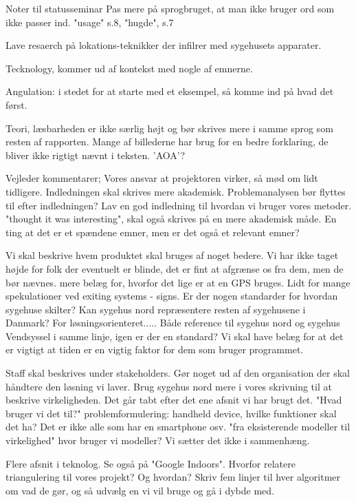 Noter til statusseminar 
Pas mere på sprogbruget, at man ikke bruger ord som ikke passer ind. "usage" s.8, "hugde", s.7

Lave resaerch på lokations-teknikker der infilrer med sygehusets apparater.

Tecknology, kommer ud af kontekst med nogle af emnerne. 

Angulation: i stedet for at starte med et eksempel, så komme ind på hvad det først.

Teori, læsbarheden er ikke særlig højt og bør skrives mere i samme sprog som resten af rapporten. 
		Mange af billederne har brug for en bedre forklaring, de bliver ikke rigtigt nævnt i teksten. 'AOA'?



Vejleder kommentarer;
Vores ansvar at projektoren virker, så mød om lidt tidligere. 
Indledningen skal skrives mere akademisk. 
Problemanalysen bør flyttes til efter indledningen?
Lav en god indledning til hvordan vi bruger vores metoder. "thought it was interesting", skal også skrives på en mere akademisk måde. En ting at det er et spændene emner, men er det også et relevant emner? 

Vi skal beskrive hvem produktet skal bruges af noget bedere. Vi har ikke taget højde for folk der eventuelt er blinde, det er fint at afgrænse os fra dem, men de bør nævnes. 
mere belæg for, hvorfor det lige er at en GPS bruges. 
Lidt for mange spekulationer ved exiting systems - signs. 
Er der nogen standarder for hvordan sygehuse skilter? Kan sygehus nord repræsentere resten af sygehusene i Danmark? 
For løsningsorienteret.....
Både reference til sygehus nord og sygehus Vendsyssel i samme linje, igen er der en standard?
Vi skal have belæg for at det er vigtigt at tiden er en vigtig faktor for dem som bruger programmet. 

Staff skal beskrives under stakeholders. Gør noget ud af den organisation der skal håndtere den løsning vi laver. 
Brug sygehus nord mere i vores skrivning til at beskrive virkeligheden. Det går tabt efter det ene afsnit vi har brugt det. "Hvad bruger vi det til?"
problemformulering: handheld device, hvilke funktioner skal det ha? Det er ikke alle som har en smartphone osv. 
"fra eksisterende modeller til virkelighed" hvor bruger vi modeller? Vi sætter det ikke i sammenhæng. 

Flere afsnit i teknolog. 
Se også på "Google Indoors".
Hvorfor relatere triangulering til vores projekt? Og hvordan?
Skriv fem linjer til hver algoritmer om vad de gør, og så udvælg en vi vil bruge og gå i dybde med. 
